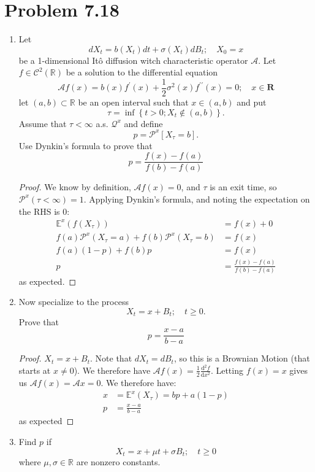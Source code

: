 \documentclass[11pt]{article}
\newcommand{\bbr}{\mathbb{R}}
\renewcommand{\P}{\mathbb{P}}
\newcommand{\ccal}{\mathcal{C}}
\newcommand{\acal}{\mathcal{A}}
\newcommand{\qcal}{\mathcal{Q}}
\newcommand{\gs}{\sigma}
\newcommand{\mrm}{\mathrm}
\newcommand{\diff}{\mrm{d}}
\newcommand{\deriv}[3][]{%
  \ensuremath{\frac{\diff^{#1} {#2}}{\diff {#3}^{#1}}}}
\renewcommand{\P}{\mathcal{P}}
\newcommand{\E}{\mathbb{E}}
\begin{document}
\section*{Problem 7.18}
\begin{enumerate}
\item Let $$
d X _ { t } = b \left( X _ { t } \right) d t + \sigma \left( X _ { t } \right) d B _ { t } ; \quad X _ { 0 } = x
$$ be a 1-dimensional It\^o diffusion witch characteristic operator $\acal$.  Let $f \in \ccal^2(\bbr)$ be a solution to the differential equation $$
\mathcal { A } f ( x ) = b ( x ) f ^ { \prime } ( x ) + \frac { 1 } { 2 } \sigma ^ { 2 } ( x ) f ^ { \prime \prime } ( x ) = 0 ; \quad x \in \mathbf { R }
$$ let $(a,b)\subset \bbr$ be an open interval such that $x \in (a,b)$ and put $$
\tau = \inf \left\{ t > 0 ; X _ { t } \notin ( a , b ) \right\}.$$  Assume that $\tau<\infty$ a.s. $\qcal^x$ and define $$
p = \P ^ { x } \left[ X _ { \tau } = b \right].
$$
Use Dynkin's formula to prove that 
$$
p = \frac { f ( x ) - f ( a ) } { f ( b ) - f ( a ) }
$$
\begin{proof}
We know by definition, $\acal f(x) =0$, and $\tau$ is an exit time, so $\P^x(\tau<\infty)=1$.  Applying Dynkin's formula, and noting the expectation on the RHS is $0$:
\begin{align*}
\E^x( f(X_\tau)) &= f(x) + 0\\
f(a) \P^x(X_\tau=a)+f(b) \P^x(X_\tau=b) &= f(x)\\
f(a)(1- p) + f(b) p & = f(x)\\
p &= \frac{f(x)-f(a)}{f(b)-f(a)}
\end{align*}
as expected.
\end{proof}
\item Now specialize to the process $$
X _ { t } = x + B _ { t } ; \quad t \geq 0.
$$
Prove that $$
p = \frac { x - a } { b - a }
$$
\begin{proof}
$X_t = x + B_t$.  Note that $dX_t = dB_t$, so this is a Brownian Motion (that starts at $x \neq 0$).  We therefore have $\acal f(x) = \frac{1}{2}\deriv[2]{f}{x}$.  Letting $f(x)=x$ gives us $\acal f(x) = \acal x = 0$.  We therefore have:
\begin{align*}
x&= \E^x (X_\tau) = b p + a(1-p)\\
p &=\frac{x-a}{b-a}
\end{align*}
as expected
\end{proof}
\item Find $p$ if $$
X _ { t } = x + \mu t + \sigma B _ { t } ; \quad t \geq 0
$$ where $\mu, \gs \in \bbr$ are nonzero constants.

\end{enumerate}
\end{document}
